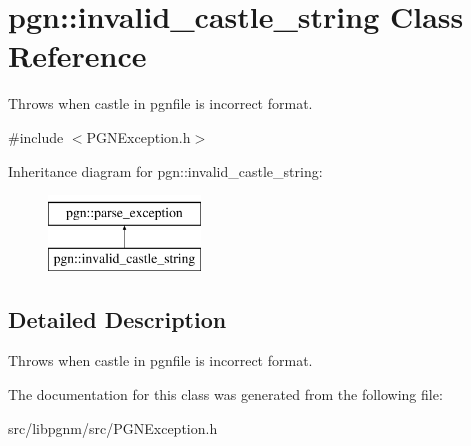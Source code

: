 \hypertarget{classpgn_1_1invalid__castle__string}{
\section{pgn::invalid\_\-castle\_\-string Class Reference}
\label{classpgn_1_1invalid__castle__string}
}


Throws when castle in pgnfile is incorrect format.  




{\ttfamily \#include $<$PGNException.h$>$}

Inheritance diagram for pgn::invalid\_\-castle\_\-string:\begin{figure}[H]
\begin{center}
\leavevmode
\includegraphics[height=2.000000cm]{classpgn_1_1invalid__castle__string}
\end{center}
\end{figure}


\subsection{Detailed Description}
Throws when castle in pgnfile is incorrect format. 

The documentation for this class was generated from the following file:\begin{DoxyCompactItemize}
\item 
src/libpgnm/src/PGNException.h\end{DoxyCompactItemize}
